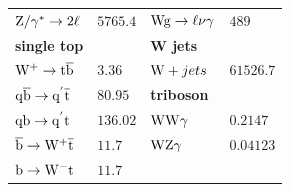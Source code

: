 \begin{table}[htb]
\begin{tabular}[width=\textwidth]{ll|ll}
  $\mathrm{Z}/\gamma^{*}\to2\ell$                           & $5765.4$                             & $\mathrm{W}\mathrm{g}\to\ell\nu\gamma$                      & $489$                                \\
  \textbf{single top}                              &                                      & \textbf{W jets}                              &                                      \\
  $\mathrm{W^+}\to\mathrm{t}\overline{\mathrm{b}}$                             & $3.36$                               & $\mathrm{W}+jets$                                   & $61526.7$                            \\
  $\mathrm{q}\overline{\mathrm{b}}\to\mathrm{q}^{'}\overline{\mathrm{t}}$                    & $80.95$                              & \textbf{triboson}                            &                                      \\
  $\mathrm{q}\mathrm{b}\to\mathrm{q}^{'}\mathrm{t}$                      & $136.02$                             & $\mathrm{W}\mathrm{W}\gamma$                                 & $0.2147$                             \\
  $\overline{\mathrm{b}}\to\mathrm{W^+}\overline{\mathrm{t}}$                            & $11.7$                               & $\mathrm{W}\mathrm{Z}\gamma$                                 & $0.04123$                            \\
  $\mathrm{b}\to\mathrm{W^-}\mathrm{t}$                              & $11.7$                               &                                              &                                      \\
  \hline
 \end{tabular}
\end{table}



